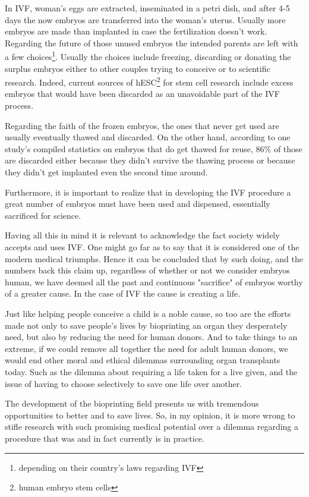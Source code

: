 \documentclass[12pt]{article} %
\begin{document}
In IVF, woman's eggs are extracted, inseminated in a petri dish, and after 4-5 days the now embryos are transferred into the woman's uterus. Usually more embryos are made than implanted in case the fertilization doesn't work. 
Regarding the future of those unused embryos the intended parents are left with a few choices\footnote{depending on their country's laws regarding IVF}. Usually the choices include freezing, discarding or donating the surplus embryos either to other couples trying to conceive or to scientific research. 
Indeed, current sources of hESC\footnote{human embryo stem cells} for stem cell research include excess embryos that would have been discarded as an unavoidable part of the IVF process\cite{Pediatrics:2012}.

Regarding the faith of the frozen embryos, the ones that never get used are usually eventually thawed and discarded. On the other hand, according to one study's \cite{Pavone:2011} compiled statistics on embryos that do get thawed for reuse, 86\% of those are discarded either because they didn't survive the thawing process or because they didn't get implanted even the second time around. 

Furthermore, it is important to realize that in developing the IVF procedure a great number of embryos must have been used and dispensed, essentially sacrificed for science. 

Having all this in mind it is relevant to acknowledge the fact society widely accepts and uses IVF. One might go far as to say that it is considered one of the modern medical triumphs. Hence it can be concluded that by such doing, and the numbers back this claim up, regardless of whether or not we consider embryos human, we have deemed all the past and continuous "sacrifice" of embryos worthy of a greater cause. In the case of IVF the cause is creating a life.

Just like helping people conceive a child is a noble cause, so too are the efforts made not only to save people's lives by bioprinting an organ they desperately need, but also by reducing the need for human donors. And to take things to an extreme, if we could remove all together the need for adult human donors, we would end other moral and ethical dilemmas surrounding organ transplants today. Such as the dilemma about requiring a life taken for a live given, and the issue of having to choose selectively to save one life over another. 

The development of the bioprinting field presents us with tremendous opportunities to better and to save lives. So, in my opinion, it is more wrong to stifle research with such promising medical potential over a dilemma regarding a procedure that was and in fact currently is in practice.
\end{document}
